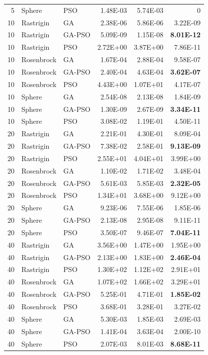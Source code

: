 \documentclass[runningheads]{llncs}
\begin{document}
\begin{table}[h!tp]
\begin{tabular}{rllrrr}
  5 & Sphere & PSO & 1.48E-03 & 5.74E-03 & 0 \\ 
10 & Rastrigin & GA & 2.38E-06 & 5.86E-06 & 3.22E-09 \\ 
  10 & Rastrigin & GA-PSO & 5.09E-09 & 1.15E-08 & {\bf 8.01E-12} \\ 
  10 & Rastrigin & PSO & 2.72E+00 & 3.87E+00 & 7.86E-11 \\ 
  10 & Rosenbrock & GA & 1.67E-04 & 2.88E-04 & 9.58E-07 \\ 
  10 & Rosenbrock & GA-PSO & 2.40E-04 & 4.63E-04 & {\bf 3.62E-07} \\ 
  10 & Rosenbrock & PSO & 4.43E+00 & 1.07E+01 & 4.17E-07 \\ 
  10 & Sphere & GA & 2.54E-08 & 2.13E-08 & 1.84E-09 \\ 
  10 & Sphere & GA-PSO & 1.30E-09 & 2.67E-09 & {\bf 3.34E-11} \\ 
  10 & Sphere & PSO & 3.08E-02 & 1.19E-01 & 4.50E-11 \\ 
  20 & Rastrigin & GA & 2.21E-01 & 4.30E-01 & 8.09E-04 \\ 
  20 & Rastrigin & GA-PSO & 7.38E-02 & 2.58E-01 & {\bf 9.13E-09} \\ 
  20 & Rastrigin & PSO & 2.55E+01 & 4.04E+01 & 3.99E+00 \\ 
  20 & Rosenbrock & GA & 1.10E-02 & 1.71E-02 & 3.48E-04 \\ 
  20 & Rosenbrock & GA-PSO & 5.61E-03 & 5.85E-03 & {\bf 2.32E-05} \\ 
  20 & Rosenbrock & PSO & 1.34E+01 & 3.68E+00 & 9.12E+00 \\ 
  20 & Sphere & GA & 9.23E-06 & 7.55E-06 & 1.85E-06 \\ 
  20 & Sphere & GA-PSO & 2.13E-08 & 2.95E-08 & 9.11E-11 \\ 
  20 & Sphere & PSO & 3.50E-07 & 9.46E-07 & {\bf 7.04E-11} \\ 
  40 & Rastrigin & GA & 3.56E+00 & 1.47E+00 & 1.95E+00 \\ 
  40 & Rastrigin & GA-PSO & 2.13E+00 & 1.83E+00 & {\bf 2.46E-04} \\ 
  40 & Rastrigin & PSO & 1.30E+02 & 1.12E+02 & 2.91E+01 \\ 
  40 & Rosenbrock & GA & 1.07E+02 & 1.66E+02 & 3.29E+01 \\ 
  40 & Rosenbrock & GA-PSO & 5.25E-01 & 4.71E-01 & {\bf 1.85E-02 }\\ 
  40 & Rosenbrock & PSO & 3.68E-01 & 3.28E-01 & 3.27E-02 \\ 
  40 & Sphere & GA & 5.30E-03 & 1.85E-03 & 2.69E-03 \\ 
  40 & Sphere & GA-PSO & 1.41E-04 & 3.63E-04 & 2.00E-10 \\ 
  40 & Sphere & PSO & 2.07E-03 & 8.01E-03 & {\bf 8.68E-11 }\\  
  \end{tabular}
\end{table}
\end{document}
